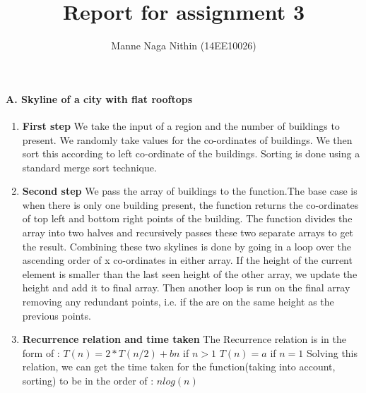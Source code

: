 \documentclass[a4paper,11pt]{article}
\title{Report for assignment 3}
\author{Manne Naga Nithin (14EE10026)}
\begin{document}
\maketitle

\paragraph{A. Skyline of a city with flat rooftops}
\begin{enumerate}
 \item \textbf{First step}
 We take the input of a region and the number of buildings to present.
 We randomly take values for the co-ordinates of buildings.
 We then sort this according to left co-ordinate of the buildings.
 Sorting is done using a standard merge sort technique.

 \item \textbf{Second step}
 We pass the array of buildings to the function.The base case is when there is only one building present, the function returns the co-ordinates of top left and bottom right points of the building.
 The function divides the array into two halves and recursively passes these two separate arrays to get the result.
 Combining these two skylines is done by going in a loop over the ascending order of x co-ordinates in either array.
 If the height of the current element is smaller than the last seen height of the other array, we update the height and add it to final array.
 Then another loop is run on the final array removing any redundant points, i.e. if the are on the same height as the previous points. 

 \item \textbf{Recurrence relation and time taken}\newline
 The Recurrence relation is in the form of :\newline
 $T(n)=2*T(n/2)+bn$ if $n>1$\newline
 $T(n)=a$         if $n=1$\newline
 Solving this relation, we can get the time taken for the function(taking into account, sorting) to be in the order of : 
 $nlog(n)$
 
 
\end{enumerate}
\end{document}
